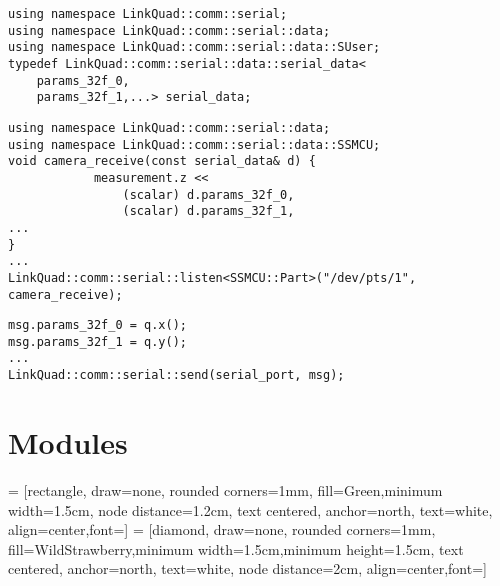         \begin{minipage}{\textwidth}
        \begin{lstlisting}
using namespace LinkQuad::comm::serial;
using namespace LinkQuad::comm::serial::data;
using namespace LinkQuad::comm::serial::data::SUser;
typedef LinkQuad::comm::serial::data::serial_data<
    params_32f_0,
    params_32f_1,...> serial_data;
        \end{lstlisting}
        \begin{lstlisting}
using namespace LinkQuad::comm::serial::data;
using namespace LinkQuad::comm::serial::data::SSMCU;
void camera_receive(const serial_data& d) {
            measurement.z <<
                (scalar) d.params_32f_0,
                (scalar) d.params_32f_1,
...
}
...
LinkQuad::comm::serial::listen<SSMCU::Part>("/dev/pts/1", camera_receive);
        \end{lstlisting}

        \end{minipage}

        \begin{minipage}{\textwidth}
        \begin{lstlisting}
msg.params_32f_0 = q.x();
msg.params_32f_1 = q.y();
...
LinkQuad::comm::serial::send(serial_port, msg);
        \end{lstlisting}
        \end{minipage}


    \section{Modules}
         = [rectangle, draw=none, rounded corners=1mm, fill=Green,minimum width=1.5cm, node distance=1.2cm,
                        text centered, anchor=north, text=white, align=center,font=\tiny]
         = [diamond, draw=none, rounded corners=1mm, fill=WildStrawberry,minimum width=1.5cm,minimum height=1.5cm,
                        text centered, anchor=north, text=white, node distance=2cm, align=center,font=\tiny]


